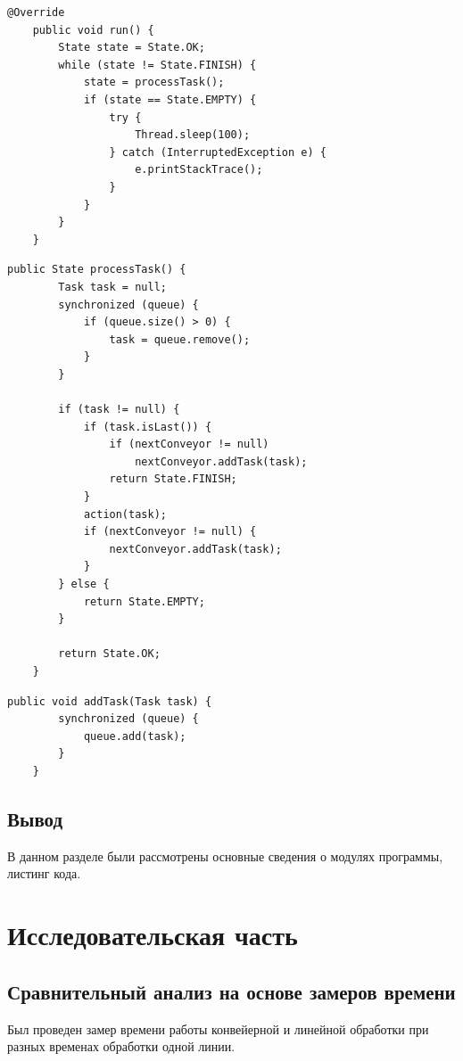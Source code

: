\documentclass[12pt]{report}
\begin{document}
\begin{lstlisting}[label=some-code,caption=Функция для запуска в потоке]
@Override
    public void run() {
        State state = State.OK;
        while (state != State.FINISH) {
            state = processTask();
            if (state == State.EMPTY) {
                try {
                    Thread.sleep(100);
                } catch (InterruptedException e) {
                    e.printStackTrace();
                }
            }
        }
    }
\end{lstlisting}

\begin{lstlisting}[label=some-code,caption=Обработка элемента]
public State processTask() {
        Task task = null;
        synchronized (queue) {
            if (queue.size() > 0) {
                task = queue.remove();
            }
        }

        if (task != null) {
            if (task.isLast()) {
                if (nextConveyor != null)
                    nextConveyor.addTask(task);
                return State.FINISH;
            }
            action(task);
            if (nextConveyor != null) {
                nextConveyor.addTask(task);
            }
        } else {
            return State.EMPTY;
        }

        return State.OK;
    }
\end{lstlisting}


\begin{lstlisting}[label=some-code,caption=Добавление элемента в очередь]
public void addTask(Task task) {
        synchronized (queue) {
            queue.add(task);
        }
    }
\end{lstlisting}

\section{Вывод}
В данном разделе были рассмотрены основные сведения о модулях программы, листинг кода.


\chapter{Исследовательская часть}

\section{Сравнительный анализ на основе замеров времени}

Был проведен замер времени работы конвейерной и линейной обработки при разных временах обработки одной линии.
 
\end{document}

